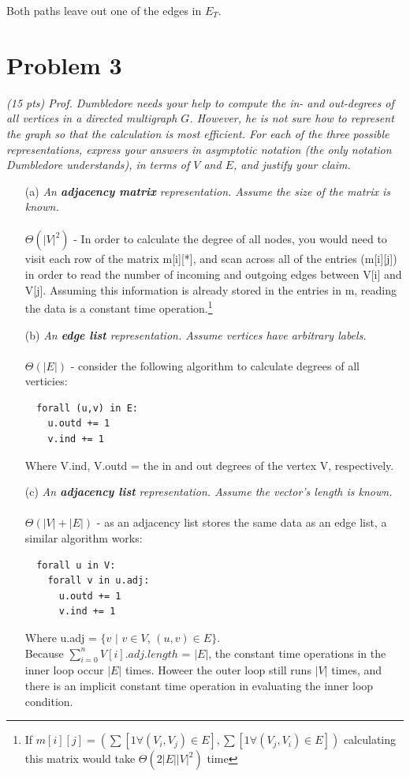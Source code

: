 \documentclass[12pt]{article} \setlength{\oddsidemargin}{0in}
\begin{document}
  Both paths leave out one of the edges in $E_T$. 

\newpage

\section*{Problem 3}

\textit{(15 pts) Prof. Dumbledore needs your help to compute the in-
  and out-degrees of all vertices in a directed multigraph
  $G$. However, he is not sure how to represent the graph so that the
  calculation is most efficient. For each of the three possible
  representations, express your answers in asymptotic notation (the
  only notation Dumbledore understands), in terms of $V$ and $E$, and
  justify your claim.}

\begin{enumerate}
\item[(a)]{\textit{An \textbf{adjacency matrix} representation. Assume
      the size of the matrix is known.}}\\\\
  $\Theta(|V|^2)$ - In order to calculate the degree of all nodes, you would need to visit each row of the matrix m[i][*], and scan across all of the entries (m[i][j]) in order to read the number of incoming and outgoing edges between V[i] and V[j]. Assuming this information is already stored in the entries in m, reading the data is a constant time operation.\footnote{If $m[i][j] = (\sum{[1 \forall (V_i,V_j) \in E]} , \sum{[1 \forall (V_j,V_i) \in E]})$ calculating this matrix would take $\Theta(2|E||V|^2)$ time}
  \\
\item[(b)]{\textit{An \textbf{edge list} representation. Assume
      vertices have arbitrary labels.}}
  \\\\
  $\Theta(|E|)$ - consider the following algorithm to calculate degrees of all verticies:
  \begin{verbatim}
  forall (u,v) in E:
    u.outd += 1
    v.ind += 1 
  \end{verbatim}
  Where V.ind, V.outd = the in and out degrees of the vertex V, respectively. 
\item[(c)]{\textit{An \textbf{adjacency list} representation. Assume
      the vector’s length is known.}}
  \\\\
  $\Theta(|V|+|E|)$ - as an adjacency list stores the same data as an edge list, a similar algorithm works:
  \begin{verbatim}
  forall u in V:
    forall v in u.adj:
      u.outd += 1
      v.ind += 1
  \end{verbatim}
  Where u.adj = $\{v$ $|$ $v \in V$, $(u,v) \in E\}$. \\
  Because $\sum_{i=0}^{n}{V[i].adj.length}$ = $|E|$, the constant time operations in the inner loop occur $|E|$ times. Howeer the outer loop still runs $|V|$ times, and there is an implicit constant time operation in evaluating the inner loop condition. 
\end{enumerate}
\end{document}
